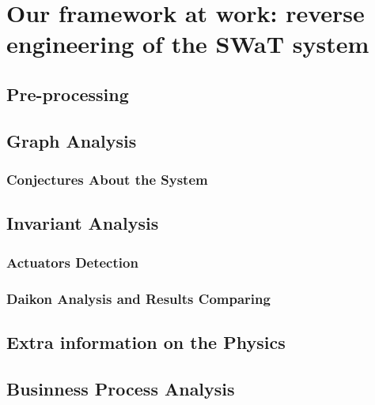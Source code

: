 \chapter{Our framework at work: reverse engineering of the SWaT system}
\label{application}
\linenumbers

\section{Pre-processing}
\label{sec:app_preprocessing}

\section{Graph Analysis}
\label{sec:app_graphs}

\subsection{Conjectures About the System}

\section{Invariant Analysis}
\label{sec:app_invariants}

\subsection{Actuators Detection}
\subsection{Daikon Analysis and Results Comparing}

\section{Extra information on the Physics}
\label{sec:app_extrainfo}

\section{Businness Process Analysis}
\label{sec:app_bpa}

\vfill
\nolinenumbers